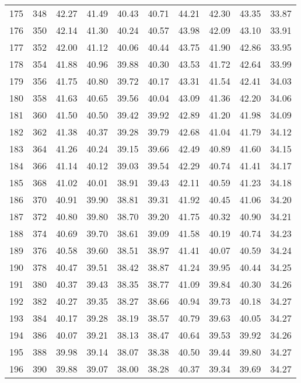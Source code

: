 \begin{longtable}{rrllllllll}
		175 & 348 & 42.27 & 41.49 & 40.43 & 40.71 & 44.21 & 42.30 & 43.35 & 33.87 \\ 
		176 & 350 & 42.14 & 41.30 & 40.24 & 40.57 & 43.98 & 42.09 & 43.10 & 33.91 \\ 
		177 & 352 & 42.00 & 41.12 & 40.06 & 40.44 & 43.75 & 41.90 & 42.86 & 33.95 \\ 
		178 & 354 & 41.88 & 40.96 & 39.88 & 40.30 & 43.53 & 41.72 & 42.64 & 33.99 \\ 
		179 & 356 & 41.75 & 40.80 & 39.72 & 40.17 & 43.31 & 41.54 & 42.41 & 34.03 \\ 
		180 & 358 & 41.63 & 40.65 & 39.56 & 40.04 & 43.09 & 41.36 & 42.20 & 34.06 \\ 
		181 & 360 & 41.50 & 40.50 & 39.42 & 39.92 & 42.89 & 41.20 & 41.98 & 34.09 \\ 
		182 & 362 & 41.38 & 40.37 & 39.28 & 39.79 & 42.68 & 41.04 & 41.79 & 34.12 \\ 
		183 & 364 & 41.26 & 40.24 & 39.15 & 39.66 & 42.49 & 40.89 & 41.60 & 34.15 \\ 
		184 & 366 & 41.14 & 40.12 & 39.03 & 39.54 & 42.29 & 40.74 & 41.41 & 34.17 \\ 
		185 & 368 & 41.02 & 40.01 & 38.91 & 39.43 & 42.11 & 40.59 & 41.23 & 34.18 \\ 
		186 & 370 & 40.91 & 39.90 & 38.81 & 39.31 & 41.92 & 40.45 & 41.06 & 34.20 \\ 
		187 & 372 & 40.80 & 39.80 & 38.70 & 39.20 & 41.75 & 40.32 & 40.90 & 34.21 \\ 
		188 & 374 & 40.69 & 39.70 & 38.61 & 39.09 & 41.58 & 40.19 & 40.74 & 34.23 \\ 
		189 & 376 & 40.58 & 39.60 & 38.51 & 38.97 & 41.41 & 40.07 & 40.59 & 34.24 \\ 
		190 & 378 & 40.47 & 39.51 & 38.42 & 38.87 & 41.24 & 39.95 & 40.44 & 34.25 \\ 
		191 & 380 & 40.37 & 39.43 & 38.35 & 38.77 & 41.09 & 39.84 & 40.30 & 34.26 \\ 
		192 & 382 & 40.27 & 39.35 & 38.27 & 38.66 & 40.94 & 39.73 & 40.18 & 34.27 \\ 
		193 & 384 & 40.17 & 39.28 & 38.19 & 38.57 & 40.79 & 39.63 & 40.05 & 34.27 \\ 
		194 & 386 & 40.07 & 39.21 & 38.13 & 38.47 & 40.64 & 39.53 & 39.92 & 34.26 \\ 
		195 & 388 & 39.98 & 39.14 & 38.07 & 38.38 & 40.50 & 39.44 & 39.80 & 34.27 \\ 
		196 & 390 & 39.88 & 39.07 & 38.00 & 38.28 & 40.37 & 39.34 & 39.69 & 34.27 \\ 

\end{longtable}
